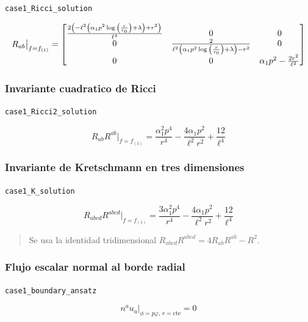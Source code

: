 \documentclass[11pt,a4paper]{article}
\begin{document}
\noindent\texttt{case1\_Ricci\_solution}\par\nopagebreak[4]

\[
\resizebox{\textwidth}{!}{$\displaystyle R_{ab}\big|_{f=f_{(1)}} = \left[\begin{matrix}\frac{2 \left(- \ell^{2} \left(\alpha_{1} p^{2} \log{\left(\frac{r}{r_{0}} \right)} + \lambda\right) + r^{2}\right)}{\ell^{4}} & 0 & 0\\0 & \frac{2}{\ell^{2} \left(\alpha_{1} p^{2} \log{\left(\frac{r}{r_{0}} \right)} + \lambda\right) - r^{2}} & 0\\0 & 0 & \alpha_{1} p^{2} - \frac{2 r^{2}}{\ell^{2}}\end{matrix}\right]$}
\]

\subsubsection{Invariante cuadratico de Ricci}

\noindent\texttt{case1\_Ricci2\_solution}\par\nopagebreak[4]

\[
R_{ab}R^{ab}\big|_{f=f_{(1)}} = \frac{\alpha_{1}^{2} p^{4}}{r^{4}} - \frac{4 \alpha_{1} p^{2}}{\ell^{2} r^{2}} + \frac{12}{\ell^{4}}
\]

\subsubsection{Invariante de Kretschmann en tres dimensiones}

\noindent\texttt{case1\_K\_solution}\par\nopagebreak[4]

\[
R_{abcd}R^{abcd}\big|_{f=f_{(1)}} = \frac{3 \alpha_{1}^{2} p^{4}}{r^{4}} - \frac{4 \alpha_{1} p^{2}}{\ell^{2} r^{2}} + \frac{12}{\ell^{4}}
\]

\begin{quote}\small Se usa la identidad tridimensional \(R_{abcd}R^{abcd}=4R_{ab}R^{ab}-R^2\).\end{quote}

\subsubsection{Flujo escalar normal al borde radial}

\noindent\texttt{case1\_boundary\_ansatz}\par\nopagebreak[4]

\[
n^au_a\big|_{\phi=p\varphi,\,r=\mathrm{cte}} = 0
\]
\end{document}
